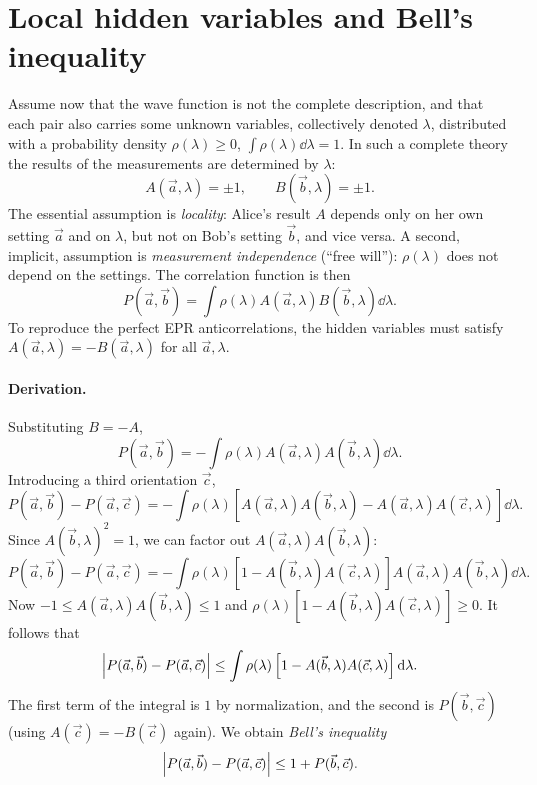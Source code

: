\section{Local hidden variables and Bell's inequality}
Assume now that the wave function is not the complete description, and that each pair also carries some unknown variables, collectively denoted $\lambda$,
distributed with a probability density $\rho(\lambda)\ge0$, $\int\rho(\lambda)\dd\lambda=1$. In such a complete theory the results of the measurements
are determined by $\lambda$:
\begin{equation}
  A(\vec a,\lambda)=\pm1,\qquad B(\vec b,\lambda)=\pm1.
\end{equation}
The essential assumption is \emph{locality}: Alice's result $A$ depends only on her own setting $\vec a$ and on $\lambda$, but not on Bob's setting $\vec b$,
and vice versa. A second, implicit, assumption is \emph{measurement independence} (``free will''): $\rho(\lambda)$ does not depend on the settings. The correlation
function is then
\begin{equation}\label{eq:lhvcorr}
  P(\vec a,\vec b)=\int\rho(\lambda)A(\vec a,\lambda)B(\vec b,\lambda)\dd\lambda.
\end{equation}
To reproduce the perfect EPR anticorrelations, the hidden variables must satisfy $A(\vec a,\lambda)=-B(\vec a,\lambda)$ for all $\vec a,\lambda$.

\paragraph{Derivation.} Substituting $B=-A$,
\begin{equation}
  P(\vec a,\vec b)=-\int\rho(\lambda)A(\vec a,\lambda)A(\vec b,\lambda)\dd\lambda .
\end{equation}
Introducing a third orientation $\vec c$,
\begin{equation}
  P(\vec a,\vec b)-P(\vec a,\vec c)=-\int\rho(\lambda)\left[A(\vec a,\lambda)A(\vec b,\lambda)-A(\vec a,\lambda)A(\vec c,\lambda)\right]\dd\lambda.
\end{equation}
Since $A(\vec b,\lambda)^2=1$, we can factor out $A(\vec a,\lambda)A(\vec b,\lambda)$:
\begin{equation}
  P(\vec a,\vec b)-P(\vec a,\vec c)=-\int\rho(\lambda)\left[1-A(\vec b,\lambda)A(\vec c,\lambda)\right]A(\vec a,\lambda)A(\vec b,\lambda)\dd\lambda .
\end{equation}
Now $-1\le A(\vec a,\lambda)A(\vec b,\lambda)\le1$ and $\rho(\lambda)[1-A(\vec b,\lambda)A(\vec c,\lambda)]\ge0$. It follows that
\begin{equation}
  \left|P(\vec a,\vec b)-P(\vec a,\vec c)\right|\le\int\rho(\lambda)\left[1-A(\vec b,\lambda)A(\vec c,\lambda)\right]\mathrm d\lambda.
\end{equation}
The first term of the integral is $1$ by normalization, and the second is $P(\vec b,\vec c)$ (using $A(\vec c)=-B(\vec c)$ again). We obtain \emph{Bell's inequality}
\begin{equation}\label{eq:bellineq}
  \left|P(\vec a,\vec b)-P(\vec a,\vec c)\right|\le1+P(\vec b,\vec c).
\end{equation}

